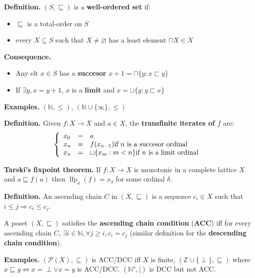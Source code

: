 \documentclass[10pt,landscape]{article}
\begin{document}
\begin{multicols}{3}
\textbf{Definition.} $(S, \sqsubseteq)$ is a \textbf{well-ordered set} if:
\begin{itemize}\setlength{\itemsep}{-0.7mm}
\item $\sqsubseteq$ is a total-order on $S$
\item every $X \subseteq S$ such that $X \neq \varnothing$ has a least element $\sqcap X \in X$
\end{itemize}

\textbf{Consequence.}
\begin{itemize}\setlength{\itemsep}{-0.7mm}
\item Any elt $x \in S$ has a \textbf{succesor} $x + 1 = \sqcap \{ y : x \sqsubset y \}$
\item If $\exists y, x = y + 1$, $x$ is a \textbf{limit} and $x = \sqcup \{ y : y \sqsubset x \}$ %
\end{itemize}

\textbf{Examples.} $(\mathbb{N}, \leq)$, $(\mathbb{N} \cup \{ \infty \}, \leq)$

\textbf{Definition.} Given $f : X \rightarrow X$ and $a \in X$, the \textbf{transfinite iterates of $f$} are:
\begin{eqnarray*}
  \left\lbrace
  \begin{array}{lcl}
    x_0 &=& a\\ %
    x_n &=& f(x_{n - 1}) \textup{if $n$ is a succesor ordinal}\\ %
    x_n &=& \sqcup \{ x_m : m < n \} \textup{if $n$ is a limit ordinal} %
  \end{array}\right.
\end{eqnarray*}

\textbf{Tarski's fixpoint theorem.} If $f : X \rightarrow X$ is monotonic in a complete lattice $X$ and $a \sqsubseteq f(a)$ then $\operatorname{lfp}_a(f) = x_{\delta}$ for some ordinal $\delta$.

\textbf{Definition.} An ascending chain $C$ in $(X, \sqsubseteq)$ is a sequence $c_i \in X$ such that $i \leq j \Rightarrow c_i \leq c_j$.

A poset $(X, \sqsubseteq)$ satisfies the \textbf{ascending chain condition} (\textbf{ACC}) iff for every ascending chain $C$, $\exists i \in \mathbb{N}, \forall j \geq i, c_i = c_j$ (similar definition for the \textbf{descending chain condition}).

\textbf{Examples.} $(\mathcal{P}(X), \subseteq)$ is ACC/DCC iff $X$ is finite, $(\mathbb{Z} \cup \{ \perp \}, \sqsubseteq)$ where $x \sqsubseteq y \Leftrightarrow x = \perp \vee x = y$ is ACC/DCC. $(\mathbb{N}^{\star}, |)$ is DCC but not ACC.


\end{multicols}
\end{document}
